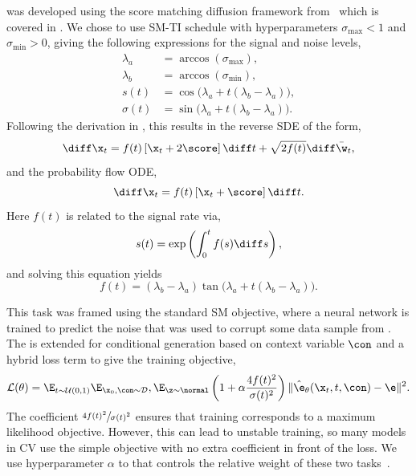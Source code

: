 \pcjedi was developed using the score matching diffusion framework from~\textcite{ScoreBasedGenerativeModeling} which is covered in .
We chose to use SM-TI schedule with hyperparameters $\sigma_\text{max}<1$ and $\sigma_\text{min}>0$, giving the following expressions for the signal and noise levels,
\begin{align}
  \lambda_a & = \arccos(\sigma_\text{max}), \\
  \lambda_b & = \arccos(\sigma_\text{min}), \\
  s(t) & = \cos\bigl(\lambda_a + t(\lambda_b - \lambda_a)\bigr), \\
  \sigma(t) & = \sin\bigl(\lambda_a + t(\lambda_b - \lambda_a)\bigr).
\end{align}
Following the derivation in , this results in the reverse SDE of the form,
\begin{equation}
    \label{eq:jedi_reverse_vp_sde}
    \diff\x_t = f(t) \left[ \x_t + 2 \score \right] \diff t + \sqrt{2 f(t)} \diff \bar\w_t,
\end{equation}
and the probability flow ODE,
\begin{equation}
    \label{eq:jedi_vp_ode}
    \diff \x_t = f(t) \left[ \x_t + \score \right] \diff t.
\end{equation}
Here $f(t)$ is related to the signal rate via,
\begin{equation}
    s(t) = \exp\left(\int_0^t f(s) \diff s\right),
\end{equation}
and solving this equation yields
\begin{equation}
    f(t) = (\lambda_b - \lambda_a) \tan\bigl(\lambda_a + t(\lambda_b - \lambda_a)\bigr).
\end{equation}

This task was framed using the standard SM objective, where a neural network is trained to predict the noise that was used to corrupt some data sample from .
The is extended for conditional generation based on context variable $\con$ and a hybrid loss term to give the training objective,
\begin{equation}
    \label{eq:training_objective}
    \mathcal{L}(\theta) =
    \E_{t\sim \mathcal{U}(0, 1)}
    \E_{\x_0, \con \sim \mathcal{D}},
    \E_{\z \sim \normal}
    \left(1 + \alpha \frac{4f(t)^2}{\sigma(t)^2}\right)
    \| \hat\e_\theta (\x_t, t, \con) - \e \|^2.
\end{equation}
The coefficient $\sfrac{4f(t)^2}{\sigma(t)^2}$ ensures that training corresponds to a maximum likelihood objective.
However, this can lead to unstable training, so many models in CV use the simple objective with no extra coefficient in front of the loss.
We use hyperparameter $\alpha$ to that controls the relative weight of these two tasks~\cite{ImprovedDenoisingDiffusion}.

